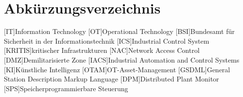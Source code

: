 \section*{Abkürzungsverzeichnis}
\begin{acronym}
  [IT]{Information Technology}
  [OT]{Operational Technology}
  [BSI]{Bundesamt für Sicherheit in der Informationstechnik}
  [ICS]{Industrial Control System}
  [KRITIS]{kritischer Infrastrukturen}
  [NAC]{Network Access Control}
  [DMZ]{Demilitarisierte Zone}
  [IACS]{Industrial Automation and Control Systems}
  [KI]{Künstliche Intelligenz}
  [OTAM]{OT-Asset-Management}
  [GSDML]{General Station Description Markup Language}
  [DPM]{Distributed Plant Monitor}
  [SPS]{Speicherprogrammierbare Steuerung}
\end{acronym}
\newpage

